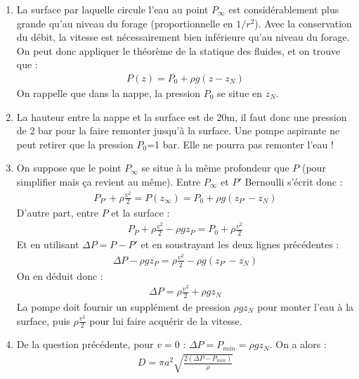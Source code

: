 \begin{correction}

\begin{enumerate}

	\item La surface par laquelle circule l'eau au point $P_\infty$ est considérablement plus grande qu'au niveau du forage (proportionnelle en $1/r^2$). Avec la conservation du débit, la vitesse est nécessairement bien inférieure qu'au niveau du forage. On peut donc appliquer le théorème de la statique des fluides, et on trouve que :
	\begin{align*}
		P(z)=P_0+\rho g (z-z_N)
	\end{align*}
On rappelle que dans la nappe, la pression $P_0$ se situe en $z_N$.

	\item La hauteur entre la nappe et la surface est de 20m, il faut donc une pression de 2 bar pour la faire remonter jusqu'à la surface. Une pompe aspirante ne peut retirer que la pression $P_0$=1 bar. Elle ne pourra pas remonter l'eau !
	
	\item On suppose que le point $P_\infty$ se situe à la même profondeur que $P$ (pour simplifier mais ça revient au même). Entre  $P_\infty$ et $P'$ Bernoulli s'écrit donc :
	\begin{align*}
		P_{P'}+\rho\frac{v^2}{2}=P(z_\infty)=P_0+\rho g (z_{P'}-z_N)
	\end{align*}
	D'autre part, entre $P$ et la surface :
	\begin{align*}
		P_{P}+\rho\frac{v^2}{2}-\rho g z_{P}=P_0+\rho\frac{v^2}{2}
	\end{align*}	
	Et en utilisant $\Delta P=P-P'$ et en soustrayant les deux lignes précédentes :
	\begin{align*}
		\Delta P-\rho g z_{P}=\rho\frac{v^2}{2}-\rho g (z_{P'}-z_N)
	\end{align*}
	On en déduit donc :
	\begin{align*}
		\Delta P=\rho\frac{v^2}{2}+\rho g z_N
	\end{align*}	
	La pompe doit fournir un supplément de pression $\rho g z_N$ pour monter l'eau à la surface, puis $\rho\frac{v^2}{2}$ pour lui faire acquérir de la vitesse.
	
	\item De la question précédente, pour $v=0$ : $\Delta P =P_{min} = \rho g z_N$. On a alors :
	\begin{align*}
		D=\pi a^2 \sqrt{\frac{2(\Delta P-P_{min})}{\rho}}
	\end{align*}
	

\end{enumerate}
\end{correction}
